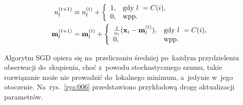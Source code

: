 \documentclass{praca1}
\begin{document}
\begin{align}
n^{(t+1)}_l& = n^{(t)}_l + \left\{
\begin{array}{l l}     
    1, & \text{gdy } l~= C(i), \\
    0, & \text{wpp.}
\end{array}\right. \\
\mathbf{m}_l^{(t+1)}& = \mathbf{m}_l^{(t)} + \left\{
\begin{array}{l l}     
    \frac{1}{n_l}(\mathbf{x}_i - \mathbf{m}^{(t)}_l), & \text{gdy } l~= C(i), \\
    0, & \text{wpp.}
\end{array}\right.
\end{align}


Algorytm SGD opiera się na~przeliczaniu średniej po~każdym przydzieleniu obserwacji do~skupienia, choć z~powodu stochastycznego szumu, takie rozwiązanie może nie prowadzić do~lokalnego minimum, a~jedynie w~jego otoczenie. Na~rys.~\ref{rys:006} przedstawiono przykładową drogę aktualizacji parametrów. 
\end{document}
